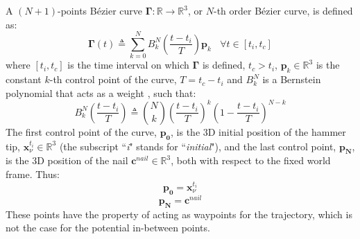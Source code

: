 \documentclass[conference]{IEEEtran}
\begin{document}
A $(N+1)$-points Bézier curve $\bm \Gamma: \mathbb{R} \to \mathbb{R}^3$, or $N$-th order Bézier curve, is defined as: 
\begin{equation}
    \bm \Gamma(t) \triangleq \sum_{k=0}^{N} B^N_k \left( \frac{t-t_{i}}{T} \right) \mathbf{p}_k \ \ \ \ \forall t \in [t_i, t_c]
\label{Bézier curve}
\end{equation}
where $[t_{i}, t_{c}]$ is the time interval on which $\bm \Gamma$ is defined, $t_{c} > t_{i}$, $\mathbf{p}_k \in \mathbb{R}^3$ is the constant $k$-th control point of the curve, $T = t_{c} - t_{i}$ and $B^N_k$ is a Bernstein polynomial that acts as a weight \cite{ComputerGraphics}, such that: 
\begin{equation}
        B^N_k \left( \frac{t-t_{i}}{T} \right) \triangleq \binom{N}{k} \left( \frac{t-t_{i}}{T} \right)^k \left(1-\frac{t-t_{i}}{T}\right)^{N-k}
    \label{bernstein polynomial}
\end{equation}
The first control point of the curve, $\mathbf{p_0}$, is the 3D initial position of the hammer tip, $\mathbf{x}_{\nu}^{t_i} \in \mathbb{R}^3$ (the subscript ``\textit{i}" stands for ``\textit{initial}"), and the last control point, $\mathbf{p_N}$, is the 3D position of the nail $\mathbf{c}^{nail} \in \mathbb{R}^3$, both with respect to the fixed world frame. Thus:
\begin{equation}
    \mathbf{p_0} = \mathbf{x}_{\nu}^{t_i}
\end{equation}
\begin{equation}
    \mathbf{p_N} = \mathbf{c}^{nail} 
\end{equation}
These points have the property of acting as waypoints for the trajectory, which is not the case for the potential in-between points.
\end{document}
